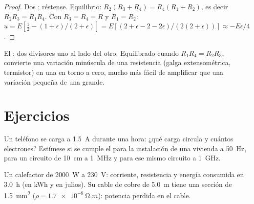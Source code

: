 \begin{proof}
Dos ; réstense. Equilibrio: $R_2(R_3 + R_4) = R_4(R_1 +
R_2)$, es decir $R_2R_3 = R_1R_4$. Con $R_3 = R_4 = R$ y $R_1 = R_2$:
$u = E[\tfrac12 - (1 + \epsilon)/(2 + \epsilon)] = E[(2 + \epsilon - 2 -
2\epsilon)/(2(2 + \epsilon))] \approx -E\epsilon/4$.
\end{proof}

\begin{omfigure}

{\small El : dos divisores uno al lado del otro.
Equilibrado cuando $R_1R_4 = R_2R_3$, convierte una variación minúscula de
una resistencia (galga extensométrica, termistor) en una  en torno
a cero, mucho más fácil de amplificar que una variación pequeña de una
 grande.}
\end{omfigure}

\section{Ejercicios}

\begin{exercise}[$\star$]\label{exo:b1:dc-circuits:1}
Un teléfono se carga a \qty{1.5}{A} durante una hora: ¿qué carga circula y
cuántos electrones? Estímese si se cumple el 
para la instalación de una vivienda a \qty{50}{Hz}, para un circuito de
\qty{10}{cm} a \qty{1}{MHz} y para ese mismo circuito a \qty{1}{GHz}.
\end{exercise}

\begin{exercise}[$\star$]\label{exo:b1:dc-circuits:2}
Un calefactor de \qty{2000}{W} a \qty{230}{V}: corriente, resistencia y
energía consumida en \qty{3.0}{h} (en kWh y en julios). Su cable de cobre
de \qty{5.0}{m} tiene una sección de \qty{1.5}{mm^2}
($\rho = \qty{1.7e-8}{\ohm.m}$): potencia perdida en el cable.
\end{exercise}

